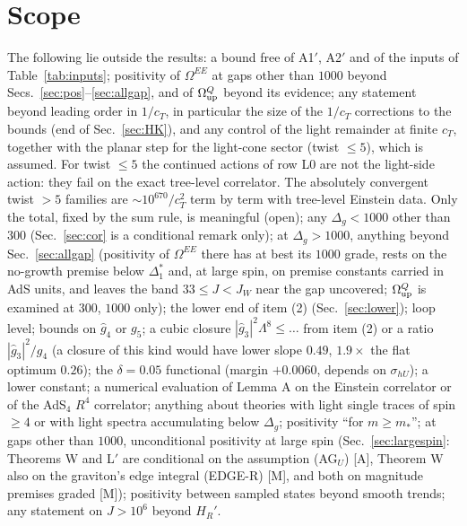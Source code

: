 \documentclass[aps,prl,onecolumn,superscriptaddress,nofootinbib]{revtex4-2}
\begin{document}
\section{Scope} The following lie outside the results: a bound free of A1$'$, A2$'$ and of the inputs of Table~\ref{tab:inputs}; positivity of $\Omega^{EE}$ at gaps other than $1000$ beyond
Secs.~\ref{sec:pos}--\ref{sec:allgap}, and of $\Omega^Q_{\rm up}$ beyond its evidence; any statement beyond leading order in $1/c_T$, in particular the size of the $1/c_T$
corrections to the bounds (end of Sec.~\ref{sec:HK}), and any control of the light remainder at finite $c_T$, together with the planar step for the light-cone sector (twist $\le5$), which is assumed. For twist $\le5$ the continued actions of row L0 are not the light-side action: they fail on the exact tree-level correlator. The absolutely convergent twist $>5$ families are $\sim10^{670}/c_T^2$ term by term with tree-level Einstein data. Only the total, fixed by the sum rule, is meaningful (open); any $\Delta_g<1000$ other than 300 (Sec.~\ref{sec:cor} is a conditional remark only); at $\Delta_g>1000$, anything beyond
Sec.~\ref{sec:allgap} (positivity of $\Omega^{EE}$ there has at best its $1000$ grade, rests on the no-growth premise below $\Delta_1^*$ and, at large
spin, on premise constants carried in AdS units, and leaves the band $33\le J<J_W$ near the gap uncovered; $\Omega^Q_{\rm up}$ is examined at $300$, $1000$ only);
the lower end of item (2) (Sec.~\ref{sec:lower});
loop level; bounds on $\hat g_4$ or $g_5$; a cubic closure $|\hat g_3|^2\Lambda^8\le\dots$ from item (2)
or a ratio $|\hat g_3|^2/g_4$ (a closure of this kind would have lower slope $0.49$, $1.9\times$
the flat optimum $0.26$); the $\delta=0.05$ functional (margin $+0.0060$, depends on $\sigma_{hU}$); a
lower constant; a numerical evaluation of Lemma A on the Einstein correlator or
of the AdS$_4$ $R^4$ correlator; anything about theories with light single traces of spin $\ge4$ or with light
spectra accumulating below $\Delta_g$; positivity ``for $m\ge m_*$''; at gaps other than $1000$, unconditional positivity at large spin
(Sec.~\ref{sec:largespin}: Theorems W and L$'$ are conditional on the assumption (AG$_U$) [A], Theorem W also on the graviton's
edge integral (EDGE-R) [M], and both on magnitude premises graded [M]); positivity between sampled states beyond smooth trends; any
statement on $J>10^6$ beyond $H_R'$.


\end{document}
